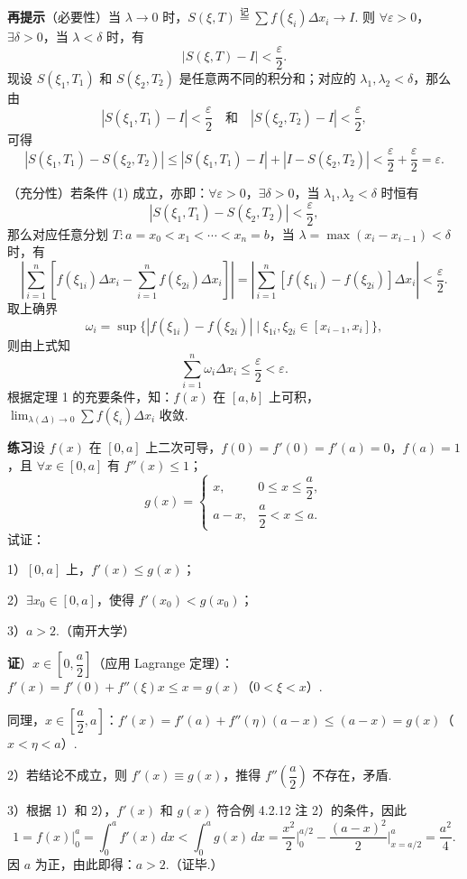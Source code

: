 \documentclass[UTF8, 12pt, fontset=fandol, oneside]{ctexart}
\begin{document}
\noindent\textbf{再提示}\quad （必要性）当 $\lambda\to0$ 时，$S(\xi,T)\stackrel{\text{记}}{=}\sum f(\xi_i)\Delta x_i\to I$. 则 $\forall\varepsilon>0$，$\exists\delta>0$，当 $\lambda<\delta$ 时，有
\[
|S(\xi,T)-I|<\frac{\varepsilon}{2}.
\]
现设 $S(\xi_1,T_1)$ 和 $S(\xi_2,T_2)$ 是任意两不同的积分和；对应的 $\lambda_1,\lambda_2<\delta$，那么由
\[
|S(\xi_1,T_1)-I|<\frac{\varepsilon}{2}\quad\text{和}\quad |S(\xi_2,T_2)-I|<\frac{\varepsilon}{2},
\]
可得
\[
|S(\xi_1,T_1)-S(\xi_2,T_2)|
\le |S(\xi_1,T_1)-I|+|I-S(\xi_2,T_2)|<\frac{\varepsilon}{2}+\frac{\varepsilon}{2}=\varepsilon.
\]

（充分性）若条件 (1) 成立，亦即：$\forall\varepsilon>0$，$\exists\delta>0$，当 $\lambda_1,\lambda_2<\delta$ 时恒有
\[
|S(\xi_1,T_1)-S(\xi_2,T_2)|<\frac{\varepsilon}{2},
\tag{2}
\]
那么对应任意分划 $T:a=x_0<x_1<\cdots<x_n=b$，当 $\lambda=\max(x_i-x_{i-1})<\delta$ 时，有
\[
\left|\sum_{i=1}^n[f(\xi_{1i})\Delta x_i-\sum_{i=1}^n f(\xi_{2i})\Delta x_i]\right|
=\left|\sum_{i=1}^n[f(\xi_{1i})-f(\xi_{2i})]\Delta x_i\right|<\frac{\varepsilon}{2}.
\]
取上确界
\[
\omega_i=\sup\{|f(\xi_{1i})-f(\xi_{2i})|\mid \xi_{1i},\xi_{2i}\in[x_{i-1},x_i]\},
\]
则由上式知
\[
\sum_{i=1}^n\omega_i\Delta x_i\le\frac{\varepsilon}{2}<\varepsilon.
\]
根据定理 1 的充要条件，知：$f(x)$ 在 $[a,b]$ 上可积，$\lim_{\lambda(\Delta)\to0}\sum f(\xi_i)\Delta x_i$ 收敛.

\noindent\textbf{练习}\quad 设 $f(x)$ 在 $[0,a]$ 上二次可导，$f(0)=f'(0)=f'(a)=0$，$f(a)=1$，且 $\forall x\in[0,a]$ 有 $f''(x)\le1$；
\[
g(x)=
\begin{cases}
x, & 0\le x\le\dfrac a2,\\
a-x, & \dfrac a2<x\le a.
\end{cases}
\]
试证：

1）$[0,a]$ 上，$f'(x)\le g(x)$；

2）$\exists x_0\in[0,a]$，使得 $f'(x_0)<g(x_0)$；

3）$a>2$.（南开大学）

\noindent\textbf{证}）$x\in\left[0,\dfrac a2\right]$（应用 Lagrange 定理）：$f'(x)=f'(0)+f''(\xi)x\le x=g(x)$（$0<\xi<x$）.

同理，$x\in\left[\dfrac a2,a\right]$：$f'(x)=f'(a)+f''(\eta)(a-x)\le(a-x)=g(x)$（$x<\eta<a$）.

2）若结论不成立，则 $f'(x)\equiv g(x)$，推得 $f''\left(\dfrac a2\right)$ 不存在，矛盾.

3）根据 1）和 2），$f'(x)$ 和 $g(x)$ 符合例 4.2.12 注 2）的条件，因此
\[
1=f(x)\bigg|_0^a=\int_0^a f'(x)\,dx<\int_0^a g(x)\,dx
=\frac{x^2}{2}\bigg|_0^{a/2}-\frac{(a-x)^2}{2}\bigg|_{x=a/2}^a
=\frac{a^2}{4}.
\]
因 $a$ 为正，由此即得：$a>2$.（证毕.）
\end{document}
